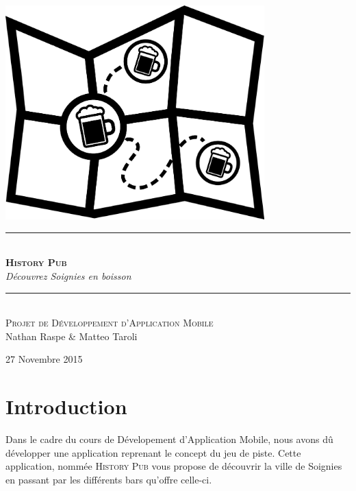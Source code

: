 \documentclass[11pt]{scrreprt}
\begin{document}
    \renewcommand{\labelitemi}{$\bullet$}
    \renewcommand{\labelitemii}{$\circ$}
    \begin{titlepage}
        \begin{center}
            \includegraphics[width=10cm]{images/logo.png}
            ~\\[1.5cm]

            \rule{\textwidth}{1pt} \\[0.4cm]
            \Huge{\textsc{\textbf{History Pub}}}\\ \Large{\textit{Découvrez Soignies en boisson}\\[0.4cm]}

            \rule{\textwidth}{1pt} \\[1.5cm]

            \textsc{\Large Projet de Développement d'Application Mobile}\\[0.5cm]

            Nathan Raspe \& Matteo Taroli

            \vfill

            {\large 27 Novembre 2015}
            \vfill
        \end{center}
    \end{titlepage}

    \tableofcontents
    \renewcommand\listfigurename{Table des illustrations}
    \listoffigures
    \pagebreak

    \chapter{Introduction}
    Dans le cadre du cours de Dévelopement d'Application Mobile, nous avons dû développer une application reprenant le concept du jeu de piste. Cette application, nommée \textsc{History Pub} vous propose de découvrir la ville de Soignies en passant par les différents bars qu'offre celle-ci.\\
\end{document}
